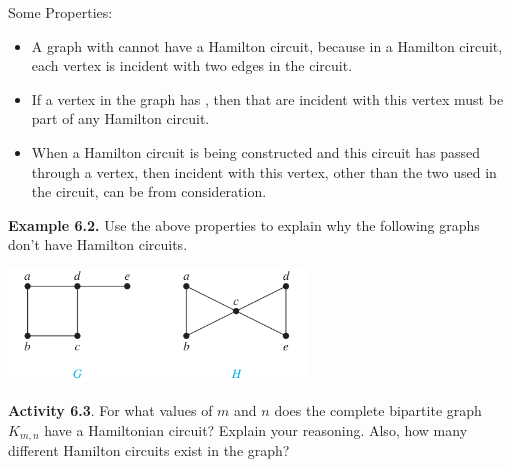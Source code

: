 \documentclass[aspectratio=169]{beamer}
\begin{document}
\begin{frame}[plain]{}

Some Properties:
\begin{itemize}
  \item A graph with  cannot have a Hamilton circuit, 
   because in a Hamilton circuit, each vertex is incident with two edges in the circuit.\pause
  \item  If a vertex in the graph has , then
       that are incident with this vertex must be part of 
      any Hamilton circuit. \pause
  \item When a Hamilton circuit is being constructed and this circuit has passed through 
  a vertex, then  incident with this vertex, other than the two used 
  in the circuit, can be  from consideration. \pause
\end{itemize}

{\bf Example 6.2.} 
Use the above properties to explain why the following graphs don't have Hamilton circuits.

  \begin{center}
        \includegraphics[height=3cm]{./img/lecture6-fig3.png}
 \end{center}

\end{frame}

\begin{frame}[plain]{}

 {\bf Activity 6.3}. 
  For what values of $m$ and $n$ does the complete bipartite graph $K_{m,n}$
 have a Hamiltonian circuit? Explain your reasoning.
 Also,  how many different Hamilton circuits exist in the graph?

  \vspace{2in}

\end{frame}


 
\end{document}

